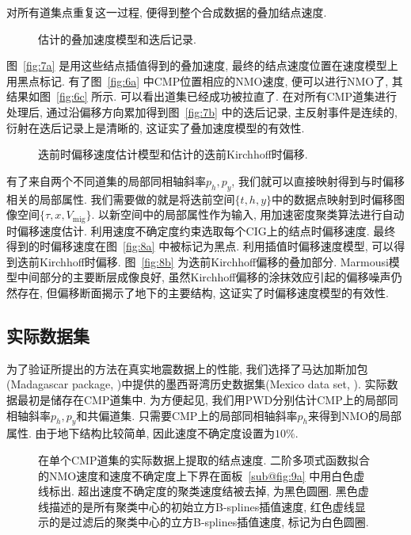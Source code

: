 对所有道集点重复这一过程, 便得到整个合成数据的叠加结点速度. 
\begin{figure}[htb]
    \centering
    \caption{估计的叠加速度模型和迭后记录. \label{fig:7}}
\end{figure}
图~\ref{fig:7a} 是用这些结点插值得到的叠加速度, 最终的结点速度位置在速度模型上用黑点标记. 有了图~\ref{fig:6a} 中CMP位置相应的NMO速度, 便可以进行NMO了, 其结果如图~\ref{fig:6c} 所示. 可以看出道集已经成功被拉直了. 在对所有CMP道集进行处理后, 通过沿偏移方向累加得到图~\ref{fig:7b} 中的迭后记录, 主反射事件是连续的, 衍射在迭后记录上是清晰的, 这证实了叠加速度模型的有效性. 
\begin{figure}[htb]
    \centering
    \caption{迭前时偏移速度估计模型和估计的迭前Kirchhoff时偏移. \label{fig:8}}
\end{figure}

有了来自两个不同道集的局部同相轴斜率$p_h, p_y$, 我们就可以直接映射得到与时偏移相关的局部属性. 我们需要做的就是将迭前空间$\{t,h,y\}$中的数据点映射到时偏移图像空间$\{\tau,x,V_{\mathrm{mig}}\}$. 以新空间中的局部属性作为输入, 用加速密度聚类算法进行自动时偏移速度估计. 利用速度不确定度约束选取每个CIG上的结点时偏移速度. 最终得到的时偏移速度在图~\ref{fig:8a} 中被标记为黑点. 利用插值时偏移速度模型, 可以得到迭前Kirchhoff时偏移. 图~\ref{fig:8b} 为迭前Kirchhoff偏移的叠加部分. Marmousi模型中间部分的主要断层成像良好, 虽然Kirchhoff偏移的涂抹效应引起的偏移噪声仍然存在, 但偏移断面揭示了地下的主要结构, 这证实了时偏移速度模型的有效性. 
\subsection{实际数据集}
为了验证所提出的方法在真实地震数据上的性能, 我们选择了马达加斯加包(Madagascar package, \cite{Fomel2013})中提供的墨西哥湾历史数据集(Mexico data set, \cite{Claerbout1995}). 实际数据最初是储存在CMP道集中. 为方便起见, 我们用PWD分别估计CMP上的局部同相轴斜率$p_h, p_y$和共偏道集. 只需要CMP上的局部同相轴斜率$p_h$来得到NMO的局部属性. 由于地下结构比较简单, 因此速度不确定度设置为$10\%$. 
\begin{figure}[htb]
    \centering
    \caption{在单个CMP道集的实际数据上提取的结点速度. 二阶多项式函数拟合的NMO速度和速度不确定度上下界在面板~\ref{sub@fig:9a} 中用白色虚线标出. 超出速度不确定度的聚类速度结被去掉, 为黑色圆圈. 黑色虚线描述的是所有聚类中心的初始立方B-splines插值速度, 红色虚线显示的是过滤后的聚类中心的立方B-splines插值速度, 标记为白色圆圈. \label{fig:9}}
\end{figure}

